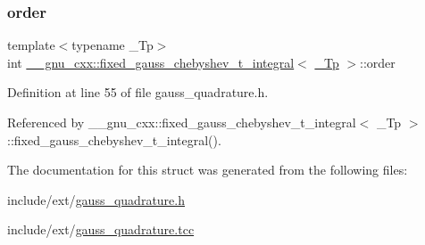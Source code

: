 \subsubsection{\texorpdfstring{order}{order}}
{\footnotesize\ttfamily template$<$typename \+\_\+\+Tp$>$ \\
int \hyperlink{struct____gnu__cxx_1_1fixed__gauss__chebyshev__t__integral}{\+\_\+\+\_\+gnu\+\_\+cxx\+::fixed\+\_\+gauss\+\_\+chebyshev\+\_\+t\+\_\+integral}$<$ \hyperlink{namespace____gnu__cxx_a3b19a9c800ca194374ef9172290f7d79}{\+\_\+\+Tp} $>$\+::order}



Definition at line 55 of file gauss\+\_\+quadrature.\+h.



Referenced by \+\_\+\+\_\+gnu\+\_\+cxx\+::fixed\+\_\+gauss\+\_\+chebyshev\+\_\+t\+\_\+integral$<$ \+\_\+\+Tp $>$\+::fixed\+\_\+gauss\+\_\+chebyshev\+\_\+t\+\_\+integral().



The documentation for this struct was generated from the following files\+:\begin{DoxyCompactItemize}
\item 
include/ext/\hyperlink{gauss__quadrature_8h}{gauss\+\_\+quadrature.\+h}\item 
include/ext/\hyperlink{gauss__quadrature_8tcc}{gauss\+\_\+quadrature.\+tcc}\end{DoxyCompactItemize}
